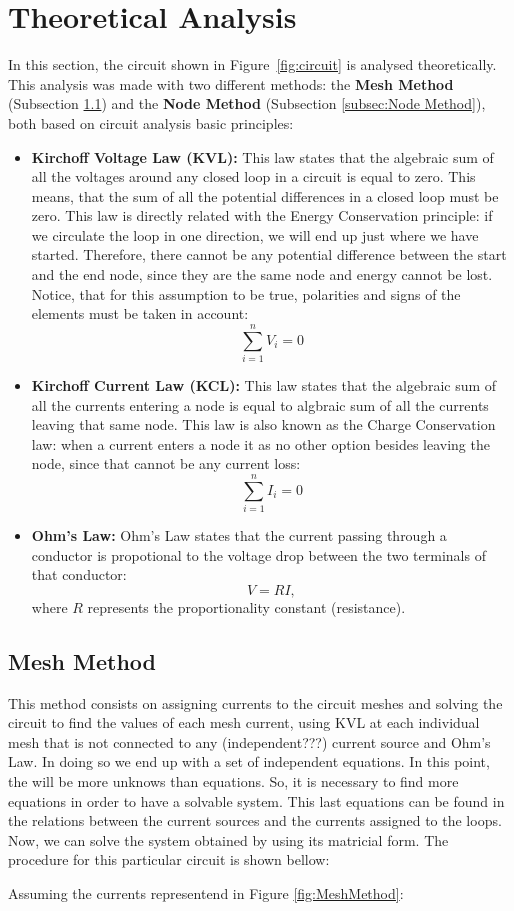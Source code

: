 \section{Theoretical Analysis}
\label{sec:analysis}

In this section, the circuit shown in Figure~\ref{fig:circuit} is analysed
theoretically. This analysis was made with two different methods: the \textbf{Mesh Method} (Subsection \ref{subsec:Mesh Method}) and the \textbf{Node Method} (Subsection \ref{subsec:Node Method}), both based on circuit analysis basic principles:
\begin{itemize}
\item \textbf{Kirchoff Voltage Law (KVL):} This law states that the algebraic sum of all the voltages around any closed loop in a circuit is equal to zero. This means, that the sum of all the potential differences in a closed loop must be zero. This law is directly related with the Energy Conservation principle: if we circulate the loop in one direction, we will end up just where we have started. Therefore, there cannot be any potential difference between the start and the end node, since they are the same node and energy cannot be lost. Notice, that for this assumption to be true, polarities and signs of the elements must be taken in account:$$\sum_{i=1}^{n}V_{i}=0$$
\item \textbf{Kirchoff Current Law (KCL):} This law states that the algebraic sum of all the currents entering a node is equal to algbraic sum of all the currents leaving that same node. This law is also known as the Charge Conservation law: when a current enters a node it as no other option besides leaving the node, since that cannot be any current loss: $$\sum_{i=1}^{n}I_{i}=0$$
  \item \textbf{Ohm's Law:} Ohm's Law states that the current passing through a conductor is propotional to the voltage drop between the two terminals of that conductor: $$V = RI,$$ where $R$ represents the proportionality constant (resistance). 
  
\end{itemize}


\subsection{Mesh Method}
\label{subsec:Mesh Method}
This method consists on assigning currents to the circuit meshes and solving the circuit to find the values of each mesh current, using KVL at each individual mesh that is not connected to any (independent???) current source and Ohm's Law. In doing so we end up with a set of independent equations. In this point, the will be more unknows than equations. So, it is necessary to find more equations in order to have a solvable system. This last equations can be found in the relations between the current sources and the currents assigned to the loops. Now, we can solve the system obtained by using its matricial form. The procedure for this particular circuit is shown bellow:\par
Assuming the currents representend in Figure \ref{fig:MeshMethod}:

